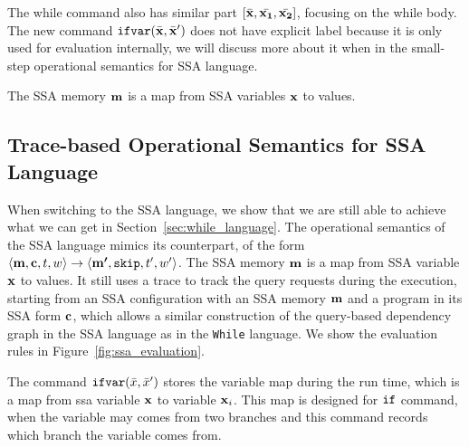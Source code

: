 \documentclass[a4paper,11pt]{article}
\begin{document}
The while command also has similar part $ [\bar{\boldsymbol{\mathbf{x}}}, \bar{\boldsymbol{\mathbf{x_1}}}, \bar{\boldsymbol{\mathbf{x_2}}}]$, focusing on the while body. 
The new command ${{\mathtt{ifvar}(\bar{\boldsymbol{\mathbf{x}}}, \bar{\boldsymbol{\mathbf{x}}}')}}$ does not have explicit label because it is only used for evaluation internally, we will discuss more about it when in the 
small-step operational semantics for SSA language. 

The SSA memory $\boldsymbol{\mathbf{m}}$ is a map from SSA variables $\boldsymbol{\mathbf{x}}$ to values.
%
%
{
\subsection{Trace-based Operational Semantics for SSA Language}
When switching to the SSA language, we show that we are still able to achieve what we can get in Section~\ref{sec:while_language}. 
The operational semantics of the SSA language mimics its counterpart, of the form $\langle \boldsymbol{\mathbf{m}}, \boldsymbol{\mathbf{c}}, t, w \rangle \to \langle \boldsymbol{\mathbf{m'}}, \mathtt{skip}, t', w' \rangle$. 
The SSA memory $\boldsymbol{\mathbf{m}}$ is a map from SSA variable $\boldsymbol{\mathbf{x}}$ to values.
It still uses a trace to track the query requests during the execution, starting from an SSA configuration with an SSA memory $\boldsymbol{\mathbf{m}}$ and a program in its SSA form $\boldsymbol{\mathbf{c}}$, 
which allows a similar construction of the query-based dependency graph in the SSA language as in the {\tt While} language.
We show the evaluation rules in Figure~\ref{fig:ssa_evaluation}.
}
%
The command 
$\mathsf{\mathtt{ifvar}}(\bar{x},\bar{x}')$ stores the variable map during the run time, which is a map from ssa variable $\boldsymbol{\mathbf{x}}$ to variable $\boldsymbol{\mathbf{x}}_i$. 
This map is designed for $\mathtt{if}$ command, when the variable may comes from two branches and this command records which branch the variable comes from. 
%
\end{document}
